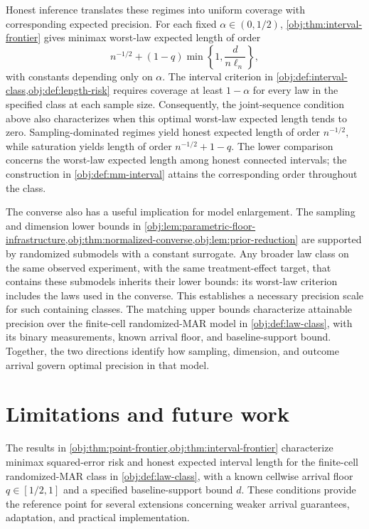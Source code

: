 \documentclass[11pt]{article}
\begin{document}
Honest inference translates these regimes into uniform coverage with corresponding expected precision. For each fixed \(\alpha\in(0,1/2)\), \cref{obj:thm:interval-frontier} gives minimax worst-law expected length of order
\[
n^{-1/2}+(1-q)\min\left\{1,\frac{d}{n\ell_n}\right\},
\]
with constants depending only on \(\alpha\). The interval criterion in \cref{obj:def:interval-class,obj:def:length-risk} requires coverage at least \(1-\alpha\) for every law in the specified class at each sample size. Consequently, the joint-sequence condition above also characterizes when this optimal worst-law expected length tends to zero. Sampling-dominated regimes yield honest expected length of order \(n^{-1/2}\), while saturation yields length of order \(n^{-1/2}+1-q\). The lower comparison concerns the worst-law expected length among honest connected intervals; the construction in \cref{obj:def:mm-interval} attains the corresponding order throughout the class.

The converse also has a useful implication for model enlargement. The sampling and dimension lower bounds in \cref{obj:lem:parametric-floor-infrastructure,obj:thm:normalized-converse,obj:lem:prior-reduction} are supported by randomized submodels with a constant surrogate. Any broader law class on the same observed experiment, with the same treatment-effect target, that contains these submodels inherits their lower bounds: its worst-law criterion includes the laws used in the converse. This establishes a necessary precision scale for such containing classes. The matching upper bounds characterize attainable precision over the finite-cell randomized-MAR model in \cref{obj:def:law-class}, with its binary measurements, known arrival floor, and baseline-support bound. Together, the two directions identify how sampling, dimension, and outcome arrival govern optimal precision in that model.


\section{Limitations and future work}

The results in \cref{obj:thm:point-frontier,obj:thm:interval-frontier} characterize minimax squared-error risk and honest expected interval length for the finite-cell randomized-MAR class in \cref{obj:def:law-class}, with a known cellwise arrival floor \(q\in[1/2,1]\) and a specified baseline-support bound \(d\). These conditions provide the reference point for several extensions concerning weaker arrival guarantees, adaptation, and practical implementation.
\end{document}
